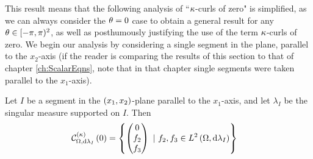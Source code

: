 This result means that the following analysis of ``$\kappa$-curls of zero" is simplified, as we can always consider the $\theta=0$ case to obtain a general result for any $\theta\in[-\pi,\pi)^2$, as well as posthumously justifying the use of the term $\kappa$-curls of zero.
We begin our analysis by considering a single segment in the plane, parallel to the $x_2$-axis (if the reader is comparing the results of this section to that of chapter \ref{ch:ScalarEqns}, note that in that chapter single segments were taken parallel to the $x_1$-axis).
\begin{prop} \label{prop:kCurlZeroParallel}
	Let $I$ be a segment in the $\left( x_1,x_2 \right)$-plane parallel to the $x_1$-axis, and let $\lambda_I$ be the singular measure supported on $I$.
	Then
	\begin{align*}
		\mathcal{C}_{ \Omega, \mathrm{d}\lambda_I}^{(\kappa)}\left( 0 \right) &= 
		\left\{ 
			\begin{pmatrix} 0 \\ f_2 \\ f_3 \end{pmatrix}
			\ \vert \ f_2,f_3\in L^{2}\left( \Omega,\mathrm{d}\lambda_I \right)					
		 \right\}
	\end{align*}
\end{prop}
